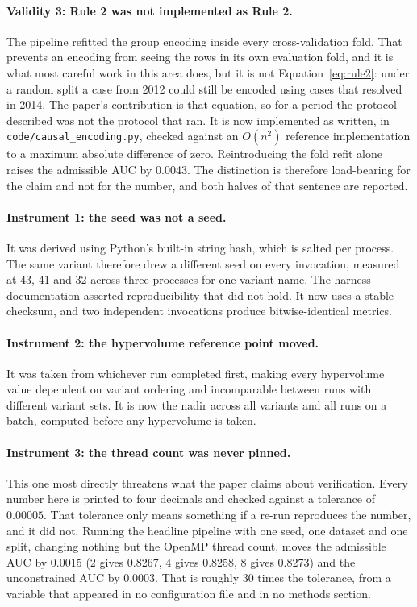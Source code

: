 \paragraph{Validity 3: Rule 2 was not implemented as Rule 2.} The pipeline refitted the
group encoding inside every cross-validation fold. That prevents an encoding from seeing the
rows in its own evaluation fold, and it is what most careful work in this area does, but it
is not Equation~\ref{eq:rule2}: under a random split a case from 2012 could still be encoded
using cases that resolved in 2014. The paper's contribution is that equation, so for a period
the protocol described was not the protocol that ran. It is now implemented as written, in
\texttt{code/causal\_encoding.py}, checked against an $O(n^2)$ reference implementation to a
maximum absolute difference of zero. Reintroducing the fold refit alone raises the admissible
AUC by \num{0.0043}. The distinction is therefore load-bearing for the claim and not for the
number, and both halves of that sentence are reported.

\paragraph{Instrument 1: the seed was not a seed.} It was derived using Python's built-in string hash, which is salted per process. The
same variant therefore drew a different seed on every invocation, measured at \num{43},
\num{41} and \num{32} across three processes for one variant name. The harness documentation
asserted reproducibility that did not hold. It now uses a stable checksum, and two independent
invocations produce bitwise-identical metrics.

\paragraph{Instrument 2: the hypervolume reference point moved.} It was taken from whichever run completed first, making every
hypervolume value dependent on variant ordering and incomparable between runs with different
variant sets. It is now the nadir across all variants and all runs on a batch, computed before
any hypervolume is taken.

\paragraph{Instrument 3: the thread count was never pinned.} This one most directly
threatens what the paper claims about verification. Every number here is
printed to four decimals and checked against a tolerance of $\num{0.00005}$. That tolerance
only means something if a re-run reproduces the number, and it did not. Running the headline
pipeline with one seed, one dataset and one split, changing nothing but the OpenMP thread
count, moves the admissible AUC by \num{0.0015} (2 gives \num{0.8267}, 4 gives \num{0.8258}, 8 gives \num{0.8273})
and the unconstrained AUC by \num{0.0003}. That is roughly \num{30} times the tolerance,
from a variable that appeared in no configuration file and in no methods section.

